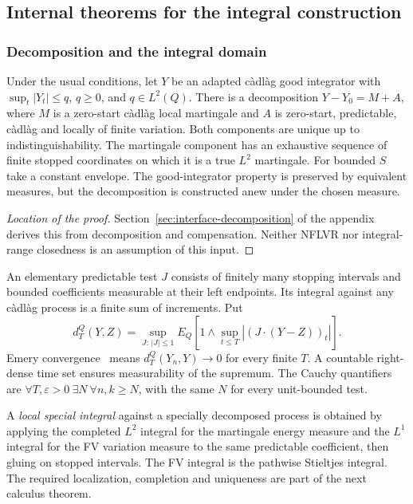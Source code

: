 \subsection{Internal theorems for the integral construction}
\label{sec:integral-background}
\subsubsection{Decomposition and the integral domain}
\begin{theorem}\label{thm:decomposition-input}
Under the usual conditions, let $Y$ be an adapted c\`adl\`ag good integrator
with $\sup_t|Y_t|\leq q$, $q\geq0$, and $q\in L^2(Q)$.
There is a decomposition $Y-Y_0=M+A$, where $M$ is a zero-start c\`adl\`ag
local martingale and $A$ is zero-start, predictable, c\`adl\`ag and locally
of finite variation. Both components are unique up to indistinguishability. The martingale component has an exhaustive sequence of finite stopped coordinates on which it is a true $L^2$ martingale.
For bounded $S$ take a constant envelope. The good-integrator property is
preserved by equivalent measures, but the decomposition is constructed anew
under the chosen measure.
\end{theorem}
\begin{proof}[Location of the proof]
Section~\ref{sec:interface-decomposition} of the appendix derives this from
decomposition and compensation. Neither NFLVR nor integral-range closedness
is an assumption of this input.
\end{proof}

An elementary predictable test $J$ consists of finitely many stopping
intervals and bounded coefficients measurable at their left endpoints.
Its integral against any c\`adl\`ag process is a finite sum of increments.
Put
\[
 d_T^Q(Y,Z)=\sup_{J:\,|J|\leq1}
 E_Q\left[1\wedge\sup_{t\leq T}|(J\cdot(Y-Z))_t|\right].
\]
Emery convergence~\cite{Emery79} means $d_T^Q(Y_n,Y)\to0$ for every finite $T$.
A countable right-dense time set ensures measurability of the supremum.
The Cauchy quantifiers are $\forall T,\varepsilon>0\ \exists N\ \forall n,k\geq N$,
with the same $N$ for every unit-bounded test.

A \emph{local special integral} against a specially decomposed process is
obtained by applying the completed $L^2$ integral for the martingale energy
measure and the $L^1$ integral for the FV variation measure to the same
predictable coefficient, then gluing on stopped intervals. The FV integral
is the pathwise Stieltjes integral. The required localization, completion
and uniqueness are part of the next calculus theorem.

